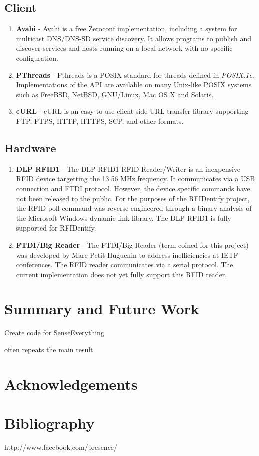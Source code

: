 \documentclass{article}
\begin{document}
	\subsection{Client}
	\begin{enumerate}
		\item	\textbf { Avahi } -
                  Avahi is a free Zeroconf implementation, including a system for multicast DNS/DNS-SD service discovery.
                  It allows programs to publish and discover services and hosts running on a local network 
                  with no specific configuration.

		\item	\textbf { PThreads } -
                  Pthreads is a POSIX standard for threads defined in \textit{POSIX.1c}. 
                  Implementations of the API are available on many Unix-like POSIX systems such as 
                  FreeBSD, NetBSD, GNU/Linux, Mac OS X and Solaris.

		\item	\textbf { cURL } -
                  cURL is an easy-to-use client-side URL transfer library supporting 
                  FTP, FTPS, HTTP, HTTPS, SCP, and other formats.
	\end{enumerate}

	\subsection{Hardware}
	\begin{enumerate}
		\item  { \bf DLP RFID1} -
                  The DLP-RFID1 RFID Reader/Writer is an inexpensive RFID device targetting the 13.56 MHz frequency.
                  It communicates via a USB connection and FTDI protocol. However, the device specific commands
                  have not been released to the public.  For the purposes of the RFIDentify project, the RFID poll
                  command was reverse engineered through a binary analysis of the Microsoft Windows dynamic link library.
                  The DLP RFID1 is fully supported for RFIDentify.

		\item  { \bf FTDI/Big Reader } -
                  The FTDI/Big Reader (term coined for this project) was developed by 
                  Marc Petit-Huguenin to address inefficiencies at IETF conferences.  The RFID
                  reader communicates via a serial protocol. The current implementation does
                  not yet fully support this RFID reader.
	\end{enumerate}
		


	
\section{Summary and Future Work}
Create code for SenseEverything 

	often repeats the main result 
\section{Acknowledgements}
\section{Bibliography} 
	http://www.facebook.com/presence/
\end{document}

